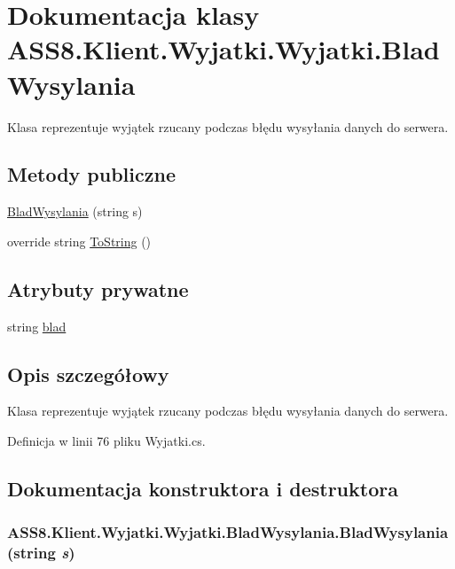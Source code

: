 \hypertarget{a00035}{
\section{Dokumentacja klasy ASS8.Klient.Wyjatki.Wyjatki.BladWysylania}
\label{d4/d8c/a00035}
}
Klasa reprezentuje wyjątek rzucany podczas błędu wysyłania danych do serwera.  


\subsection*{Metody publiczne}
\begin{CompactItemize}
\item 
\hyperlink{a00035_2d16d1271998144db10dab0cbe6c2161}{BladWysylania} (string s)
\item 
override string \hyperlink{a00035_25adb7508002e6766f59aaed820ec9f1}{ToString} ()
\end{CompactItemize}
\subsection*{Atrybuty prywatne}
\begin{CompactItemize}
\item 
string \hyperlink{a00035_a4cba0c8abed366db7c6830af13420b7}{blad}
\end{CompactItemize}


\subsection{Opis szczegółowy}
Klasa reprezentuje wyjątek rzucany podczas błędu wysyłania danych do serwera. 



Definicja w linii 76 pliku Wyjatki.cs.

\subsection{Dokumentacja konstruktora i destruktora}
\hypertarget{a00035_2d16d1271998144db10dab0cbe6c2161}{
\subsubsection[{BladWysylania}]{\setlength{\rightskip}{0pt plus 5cm}ASS8.Klient.Wyjatki.Wyjatki.BladWysylania.BladWysylania (string {\em s})}}
\label{d4/d8c/a00035_2d16d1271998144db10dab0cbe6c2161}




